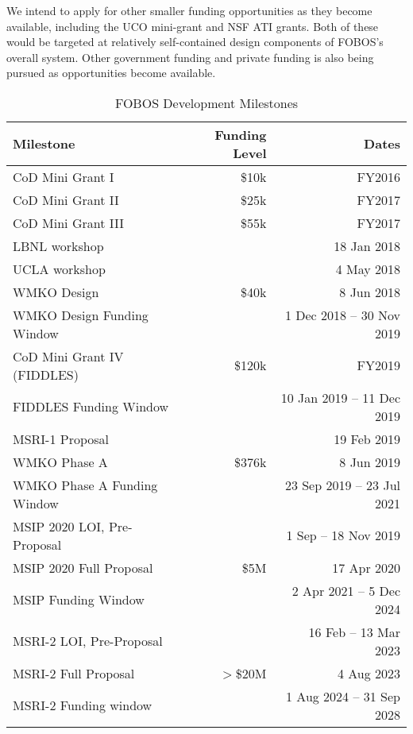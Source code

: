 We intend to apply for other smaller funding opportunities as they
become available, including the UCO mini-grant and NSF ATI grants.
Both of these would be targeted at relatively self-contained design
components of FOBOS's overall system. Other government funding and
private funding is also being pursued as opportunities become
available.

\begin{table}[h!]
\centering
\footnotesize
\caption{FOBOS Development Milestones}
\label{tab:milestones}
\vspace*{-10pt}
\begin{tabular}{l r r}
Milestone                     & Funding Level & Dates \\
\hline
\hline
CoD Mini Grant I              &  \$10k & FY2016 \\
CoD Mini Grant II             &  \$25k & FY2017 \\
CoD Mini Grant III            &  \$55k & FY2017 \\
LBNL workshop                 &        & 18 Jan 2018 \\
UCLA workshop                 &        & 4 May 2018 \\
WMKO Design                   &  \$40k & 8 Jun 2018 \\
WMKO Design Funding Window    &        & 1 Dec 2018 -- 30 Nov 2019 \\
CoD Mini Grant IV (FIDDLES)   & \$120k & FY2019 \\
FIDDLES Funding Window        &        & 10 Jan 2019 -- 11 Dec 2019 \\
\hline
MSRI-1 Proposal               &        & 19 Feb 2019 \\
WMKO Phase A                  & \$376k & 8 Jun 2019 \\
WMKO Phase A Funding Window   &        & 23 Sep 2019 -- 23 Jul 2021 \\
\hline
MSIP 2020 LOI, Pre-Proposal   &        & 1 Sep -- 18 Nov 2019 \\
MSIP 2020 Full Proposal       &   \$5M & 17 Apr 2020 \\
MSIP Funding Window           &        & 2 Apr 2021 -- 5 Dec 2024 \\
\hline
MSRI-2 LOI, Pre-Proposal      &        & 16 Feb -- 13 Mar 2023 \\
MSRI-2 Full Proposal          & $>$\$20M & 4 Aug 2023 \\
MSRI-2 Funding window         &        & 1 Aug 2024 -- 31 Sep 2028 \\
\hline
\end{tabular}
\end{table}

\newpage







